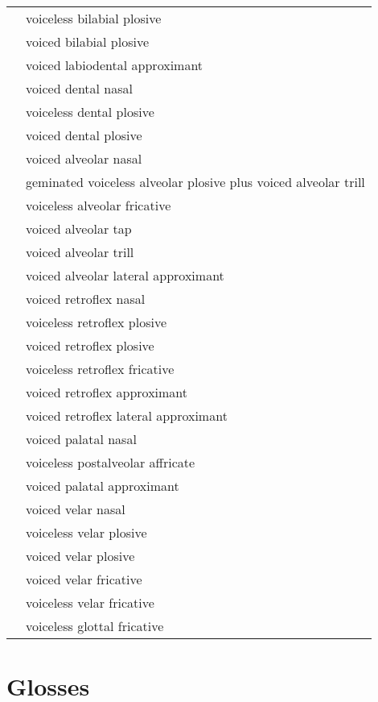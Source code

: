 \documentclass{article}
\begin{document}
\begin{xltabular}{\textwidth}{lL}
   & voiceless bilabial plosive \\
   & voiced bilabial plosive \\
   & voiced labiodental approximant \\
   & voiced dental nasal \\
   & voiceless dental plosive \\
   & voiced dental plosive \\
   & voiced alveolar nasal \\
   & geminated voiceless alveolar plosive plus voiced alveolar trill \\
   & voiceless alveolar fricative \\
   & voiced alveolar tap \\
   & voiced alveolar trill \\
   & voiced alveolar lateral approximant \\
   & voiced retroflex nasal \\
   & voiceless retroflex plosive \\
   & voiced retroflex plosive \\
   & voiceless retroflex fricative \\
   & voiced retroflex approximant \\
   & voiced retroflex lateral approximant \\
  \ipa{\textltailn} & voiced palatal nasal \\
  \ipa{\t{\textteshlig}} & voiceless postalveolar affricate \\
   & voiced palatal approximant \\
   & voiced velar nasal \\
   & voiceless velar plosive \\
   & voiced velar plosive \\
   & voiced velar fricative \\
   & voiceless velar fricative \\
   & voiceless glottal fricative \\
\end{xltabular}

\newpage\section{Glosses}
\end{document}
